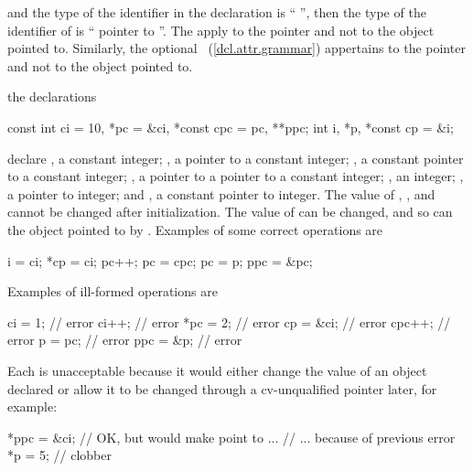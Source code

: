 and the type of the identifier in the declaration
is ``
'',
then the type of the identifier of
is `` pointer to
''.
%
%
The
apply to the pointer and not to the object pointed to.
Similarly, the optional ~(\ref{dcl.attr.grammar}) appertains to the pointer and not to the object pointed to.

\pnum
\enterexample
the declarations
%
%
\begin{codeblock}
const int ci = 10, *pc = &ci, *const cpc = pc, **ppc;
int i, *p, *const cp = &i;
\end{codeblock}

declare
,
a constant integer;
,
a pointer to a constant integer;
,
a constant pointer to a constant integer;
,
a pointer to a pointer to a constant integer;
,
an integer;
,
a pointer to integer; and
,
a constant pointer to integer.
The value of
,
,
and
cannot be changed after initialization.
The value of
can be changed, and so can the object pointed to by
.
Examples of
some correct operations are

\begin{codeblock}
i = ci;
*cp = ci;
pc++;
pc = cpc;
pc = p;
ppc = &pc;
\end{codeblock}

Examples of ill-formed operations are

\begin{codeblock}
ci = 1;             // error
ci++;               // error
*pc = 2;            // error
cp = &ci;           // error
cpc++;              // error
p = pc;             // error
ppc = &p;           // error
\end{codeblock}

Each is unacceptable because it would either change the value of an object declared
or allow it to be changed through a cv-unqualified pointer later, for example:

\begin{codeblock}
*ppc = &ci;         // OK, but would make  point to  ...
                    // ... because of previous error
*p = 5;             // clobber 
\end{codeblock}
\exitexample

